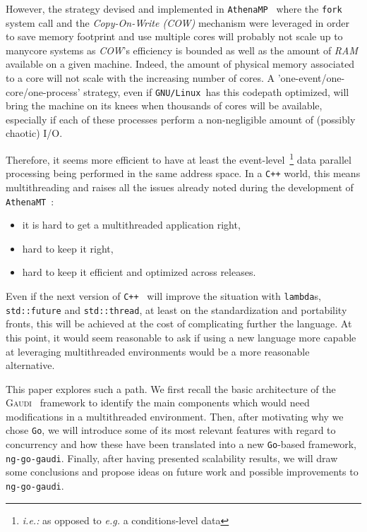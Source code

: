 \documentclass[a4paper]{jpconf}
\newcommand{\athenamp}{\texttt{AthenaMP}}
\newcommand{\athenamt}{\texttt{AthenaMT}}
\newcommand{\gaudi}{\textsc{Gaudi}}
\newcommand{\golang}{\texttt{Go}}
\newcommand{\linux}{\texttt{GNU/Linux }}
\begin{document}
However, the strategy devised and implemented in
\athenamp~\cite{ref-athenamp} where the {\tt fork} system call and the
\emph{Copy-On-Write (COW)} mechanism were leveraged in order to save memory
footprint and use multiple cores will probably not scale up to manycore
systems as \emph{COW}'s efficiency is bounded as well as the amount of
\emph{RAM} available on a given machine.
Indeed, the amount of physical memory associated to a core will not
scale with the increasing number of cores.
A 'one-event/one-core/one-process' strategy, even if \linux has
this codepath optimized, will bring the machine on its knees when
thousands of cores will be available, especially if each of these
processes perform a non-negligible amount of (possibly chaotic) I/O.

Therefore, it seems more efficient to have at least the
event-level~\footnote{\emph{i.e.:} as opposed to \emph{e.g.} a
  conditions-level data} data parallel processing being performed in
the same address space.
In a {\tt C++} world, this means multithreading and raises all the issues
already noted during the development of \athenamt~\cite{ref-athenamp}:
\begin{itemize}
\item it is hard to get a multithreaded application right,
\item hard to keep it right,
\item hard to keep it efficient and optimized across releases.
\end{itemize}

Even if the next version of {\tt C++}~\cite{ref-cxx} will improve the
situation with {\tt lambda}s, {\tt std::future} and {\tt std::thread},
at least on the standardization and portability fronts, this will be
achieved at the cost of complicating further the language.
At this point, it would seem reasonable to ask if using a new language
more capable at leveraging multithreaded environments would be a more
reasonable alternative.

This paper explores such a path.
We first recall the basic architecture of the \gaudi~\cite{ref-gaudi}
framework to identify the main components which would need
modifications in a multithreaded environment.
Then, after motivating why we chose \golang, we will introduce some of its
most relevant features with regard to concurrency and how these have
been translated into a new \golang-based framework, {\tt ng-go-gaudi}.
Finally, after having presented scalability results, we will draw
some conclusions and propose ideas on future work and possible
improvements to {\tt ng-go-gaudi}.
\end{document}
